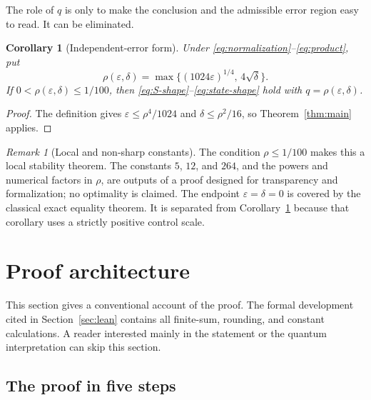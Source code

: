 \documentclass[11pt]{article}
\newtheorem{corollary}[theorem]{Corollary}
\theoremstyle{remark}
\newtheorem{remark}[theorem]{Remark}
\newcommand{\1}{\mathbf 1}
\begin{document}
The role of $q$ is only to make the conclusion and the admissible error
region easy to read. It can be eliminated.

\begin{corollary}[Independent-error form]\label{cor:rho}
Under \eqref{eq:normalization}--\eqref{eq:product}, put
\[
  \rho(\varepsilon,\delta)
  =\max\{(1024\varepsilon)^{1/4},\,4\sqrt{\delta}\}.
\]
If $0<\rho(\varepsilon,\delta)\leq1/100$, then
\eqref{eq:S-shape}--\eqref{eq:state-shape} hold with
$q=\rho(\varepsilon,\delta)$.
\end{corollary}

\begin{proof}
The definition gives
$\varepsilon\leq\rho^4/1024$ and
$\delta\leq\rho^2/16$, so Theorem~\ref{thm:main} applies.
\end{proof}

\begin{remark}[Local and non-sharp constants]
The condition $\rho\leq1/100$ makes this a local stability theorem. The
constants $5$, $12$, and $264$, and the powers and numerical factors in
$\rho$, are outputs of a proof designed for transparency and formalization;
no optimality is claimed. The endpoint $\varepsilon=\delta=0$ is covered by
the classical exact equality theorem. It is separated from
Corollary~\ref{cor:rho} because that corollary uses a strictly positive
control scale.
\end{remark}

\section{Proof architecture}\label{sec:proof}

This section gives a conventional account of the proof. The formal
development cited in Section~\ref{sec:lean} contains all finite-sum,
rounding, and constant calculations. A reader interested mainly in the
statement or the quantum interpretation can skip this section.

\subsection{The proof in five steps}
\end{document}
